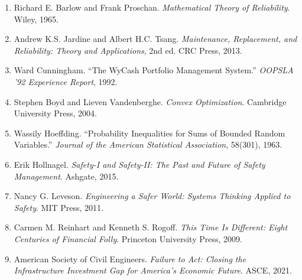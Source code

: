 \documentclass[11pt]{article}
\begin{document}
\begin{enumerate}
\item Richard E. Barlow and Frank Proschan. \emph{Mathematical Theory of Reliability}. Wiley, 1965.
\item Andrew K.S. Jardine and Albert H.C. Tsang. \emph{Maintenance, Replacement, and Reliability: Theory and Applications}, 2nd ed. CRC Press, 2013.
\item Ward Cunningham. ``The WyCash Portfolio Management System.'' \emph{OOPSLA '92 Experience Report}, 1992.
\item Stephen Boyd and Lieven Vandenberghe. \emph{Convex Optimization}. Cambridge University Press, 2004.
\item Wassily Hoeffding. ``Probability Inequalities for Sums of Bounded Random Variables.'' \emph{Journal of the American Statistical Association}, 58(301), 1963.
\item Erik Hollnagel. \emph{Safety-I and Safety-II: The Past and Future of Safety Management}. Ashgate, 2015.
\item Nancy G. Leveson. \emph{Engineering a Safer World: Systems Thinking Applied to Safety}. MIT Press, 2011.
\item Carmen M. Reinhart and Kenneth S. Rogoff. \emph{This Time Is Different: Eight Centuries of Financial Folly}. Princeton University Press, 2009.
\item American Society of Civil Engineers. \emph{Failure to Act: Closing the Infrastructure Investment Gap for America's Economic Future}. ASCE, 2021.
\end{enumerate}
\end{document}
